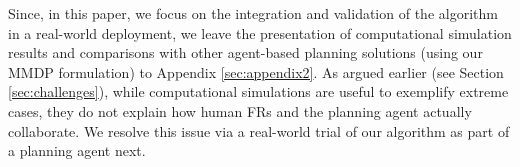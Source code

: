 Since, in this paper, we focus on the integration and validation of
the algorithm in a real-world deployment, we leave the presentation of
computational simulation results and comparisons with other
agent-based planning solutions (using our MMDP formulation) to
Appendix \ref{sec:appendix2}. As argued earlier (see Section
\ref{sec:challenges}), while computational simulations are useful to
exemplify extreme cases, they do not explain how human FRs and the
planning agent actually collaborate. We resolve this issue via a
real-world trial of our algorithm as part of a planning agent next.


